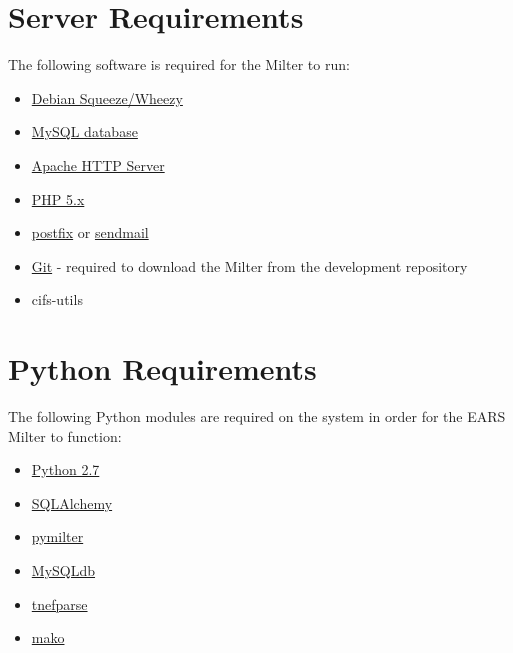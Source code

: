 \documentclass[letterpaper,10pt,english]{sphinxmanual}
\begin{document}
\section{Server Requirements}
\label{requirements:server-requirements}
The following software is required for the Milter to run:
\begin{itemize}
\item {} 
\href{http://www.debian.org/releases}{Debian Squeeze/Wheezy}

\item {} 
\href{http://www.mysql.com}{MySQL database}

\item {} 
\href{http://projects.apache.org/projects/http\_server.html}{Apache HTTP Server}

\item {} 
\href{http://www.php.net}{PHP 5.x}

\item {} 
\href{http://www.postfix.org}{postfix} or \href{http://www.sendmail.com/sm/open\_source/docs/}{sendmail}

\item {} 
\href{http://git-scm.com}{Git} - required to download the Milter from the development repository

\item {} 
cifs-utils

\end{itemize}


\section{Python Requirements}
\label{requirements:python-requirements}
The following Python modules are required on the system in order for the EARS Milter to function:
\begin{itemize}
\item {} 
\href{http://python.org}{Python 2.7}

\item {} 
\href{http://sqlalchemy.org}{SQLAlchemy}

\item {} 
\href{http://www.bmsi.com/python/milter.html}{pymilter}

\item {} 
\href{http://mysql-python.sourceforge.net/MySQLdb.html}{MySQLdb}

\item {} 
\href{https://github.com/koodaamo/tnefparse}{tnefparse}

\item {} 
\href{http://www.makotemplates.org/}{mako}

\end{itemize}
\end{document}
